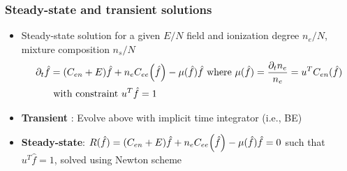 \documentclass[mathserif, aspectratio=169]{beamer}
\newcommand{\of}[1]{\mleft( #1 \mright)}
\begin{document}
\begin{frame}
	\frametitle{Steady-state and transient solutions}
	\begin{itemize}
		\item Steady-state solution for a given $E/N$ field and ionization degree $n_e/N$, mixture composition $n_s/N$
		\begin{align}
			\partial_t {\hat{f}} &=(C_{en}+E)\hat{f} +n_e C_{ee}\of{\hat{f}} - \mu(\hat{f}) \hat{f} \text{ where } \mu(\hat{f}) = \frac{\partial_t n_e}{n_e} = u^T C_{en}(\hat{f})\\
			&\text{ with constraint } u^T \hat{f} = 1 \nonumber 
		\end{align}
		\item \textbf{Transient} : Evolve above with implicit time integrator (i.e., BE)
		\item \textbf{Steady-state}: $R(\hat{f})=(C_{en}+E)\hat{f} +n_e C_{ee}\of{\hat{f}} - \mu(\hat{f}) \hat{f} =0$ such that $u^T \hat{f}=1$, solved using Newton scheme 
	\end{itemize}
\end{frame}
\end{document}

